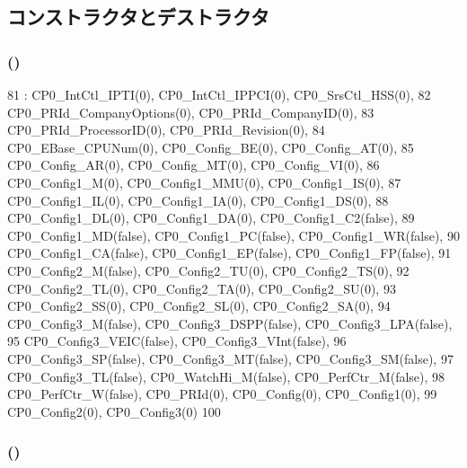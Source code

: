 \subsection{コンストラクタとデストラクタ}
\hypertarget{structMipsISA_1_1CoreSpecific_a45dbdf6d2612a6d836210996f77d89f8}{
\subsubsection[{CoreSpecific}]{ ()}}
\label{structMipsISA_1_1CoreSpecific_a45dbdf6d2612a6d836210996f77d89f8}



\begin{DoxyCode}
81         : CP0_IntCtl_IPTI(0), CP0_IntCtl_IPPCI(0), CP0_SrsCtl_HSS(0),
82           CP0_PRId_CompanyOptions(0), CP0_PRId_CompanyID(0),
83           CP0_PRId_ProcessorID(0), CP0_PRId_Revision(0),
84           CP0_EBase_CPUNum(0), CP0_Config_BE(0), CP0_Config_AT(0),
85           CP0_Config_AR(0), CP0_Config_MT(0), CP0_Config_VI(0),
86           CP0_Config1_M(0), CP0_Config1_MMU(0), CP0_Config1_IS(0),
87           CP0_Config1_IL(0), CP0_Config1_IA(0), CP0_Config1_DS(0),
88           CP0_Config1_DL(0), CP0_Config1_DA(0), CP0_Config1_C2(false),
89           CP0_Config1_MD(false), CP0_Config1_PC(false), CP0_Config1_WR(false),
90           CP0_Config1_CA(false), CP0_Config1_EP(false), CP0_Config1_FP(false),
91           CP0_Config2_M(false), CP0_Config2_TU(0), CP0_Config2_TS(0),
92           CP0_Config2_TL(0), CP0_Config2_TA(0), CP0_Config2_SU(0),
93           CP0_Config2_SS(0), CP0_Config2_SL(0), CP0_Config2_SA(0),
94           CP0_Config3_M(false), CP0_Config3_DSPP(false), CP0_Config3_LPA(false),
95           CP0_Config3_VEIC(false), CP0_Config3_VInt(false),
96           CP0_Config3_SP(false), CP0_Config3_MT(false), CP0_Config3_SM(false),
97           CP0_Config3_TL(false), CP0_WatchHi_M(false), CP0_PerfCtr_M(false),
98           CP0_PerfCtr_W(false), CP0_PRId(0), CP0_Config(0), CP0_Config1(0),
99           CP0_Config2(0), CP0_Config3(0)
100     { }
\end{DoxyCode}
\hypertarget{structMipsISA_1_1CoreSpecific_a45dbdf6d2612a6d836210996f77d89f8}{
\subsubsection[{CoreSpecific}]{ ()}}
\label{structMipsISA_1_1CoreSpecific_a45dbdf6d2612a6d836210996f77d89f8}



